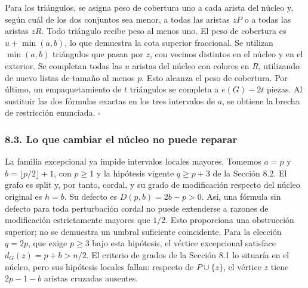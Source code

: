\documentclass[spanish,11pt,a4paper]{article}
\begin{document}
Para los triángulos, se asigna peso de cobertura uno a cada arista del
núcleo y, según cuál de los dos conjuntos sea menor, a todas las aristas
\(zP\) o a todas las aristas \(zR\). Todo triángulo recibe peso al menos
uno. El peso de cobertura es \(u+\min(a,b)\), lo que demuestra la cota
superior fraccional. Se utilizan \(\min(a,b)\) triángulos que pasan por
\(z\), con vecinos distintos en el núcleo y en el exterior. Se completan
todas las \(u\) aristas del núcleo con colores en \(R\), utilizando de
nuevo listas de tamaño al menos \(p\). Esto alcanza el peso de
cobertura. Por último, un empaquetamiento de \(t\) triángulos se
completa a \(e(G)-2t\) piezas. Al sustituir las dos fórmulas exactas en
los tres intervalos de \(a\), se obtiene la brecha de restricción
enunciada. \(\square\)

\subsubsection{8.3. Lo que cambiar el núcleo no puede
reparar}\label{lo-que-cambiar-el-nuxfacleo-no-puede-reparar}

La familia excepcional ya impide intervalos locales mayores. Tomemos
\(a=p\) y \(b=\lfloor p/2\rfloor+1\), con \(p\ge1\) y la hipótesis
vigente \(q\ge p+3\) de la Sección 8.2. El grafo es split y, por tanto,
cordal, y su grado de modificación respecto del núcleo original es
\(h=b\). Su defecto es \(D(p,b)=2b-p>0\). Así, una fórmula sin defecto
para toda perturbación cordal no puede extenderse a razones de
modificación estrictamente mayores que \(1/2\). Esto proporciona una
obstrucción superior; no se demuestra un umbral suficiente coincidente.
Para la elección \(q=2p\), que exige \(p\ge3\) bajo esta hipótesis, el
vértice excepcional satisface \(d_G(z)=p+b>n/2\). El criterio de grados
de la Sección 8.1 lo situaría en el núcleo, pero sus hipótesis locales
fallan: respecto de \(P\cup\{z\}\), el vértice \(z\) tiene \(2p-1-b\)
aristas cruzadas ausentes.
\end{document}
